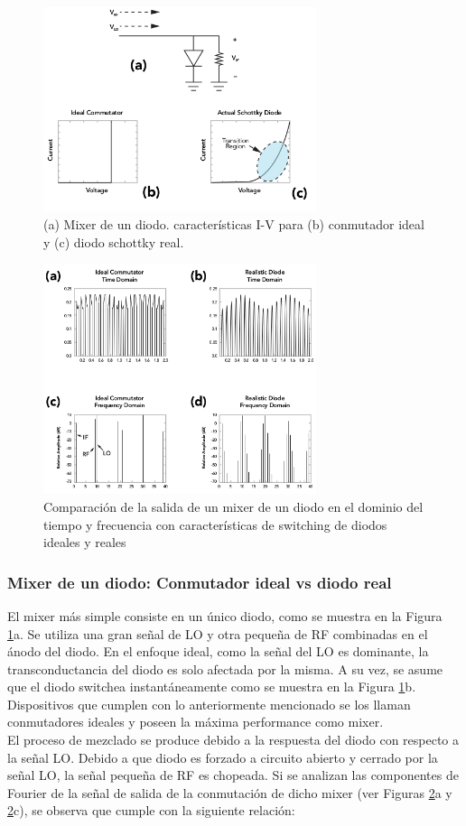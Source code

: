 \documentclass[a4paper,10pt]{article}
\begin{document}
	\begin{figure}[!htb]
		\centering
		\includegraphics[width=8cm]
		{Images/OneDiodeMixer.png}
		\caption{(a) Mixer de un diodo. características I-V para (b)
		conmutador ideal y (c) diodo schottky real.}
		\label{img:002} 
	\end{figure}

	\begin{figure}[!htb]
		\centering
		\includegraphics[width=8cm]
		{Images/OneDiodeMixerFunction.png}
		\caption{Comparaci\'on de la salida de un mixer de un diodo en el 
		dominio del tiempo y frecuencia con características de switching 
		de diodos ideales y reales} 
		\label{img:003} 
	\end{figure}


	\subsubsection{Mixer de un diodo: Conmutador ideal vs diodo real}
	\indent El mixer más simple consiste en un único diodo, como se muestra en 
	la Figura \ref{img:002}a. Se utiliza una gran señal de LO y otra pequeña de 
	RF combinadas en el ánodo del diodo. En el enfoque ideal, como la señal del 
	LO es dominante, la transconductancia del diodo es solo afectada por la 
	misma. A su vez, se asume que el diodo switchea instantáneamente como se 
	muestra en la Figura \ref{img:002}b. Dispositivos que cumplen con lo 
	anteriormente mencionado se los llaman conmutadores ideales y poseen la 
	máxima performance como mixer. \\
	\indent El proceso de mezclado se produce debido a la respuesta del diodo 
	con respecto a la señal LO. Debido a que diodo es forzado a circuito abierto 
	y cerrado por la señal LO, la señal pequeña de RF es chopeada. Si se 
	analizan las componentes de Fourier de la señal de salida de la conmutación 
	de dicho mixer (ver Figuras \ref{img:003}a y \ref{img:003}c), se observa que
	cumple con la siguiente relación:
\end{document}
